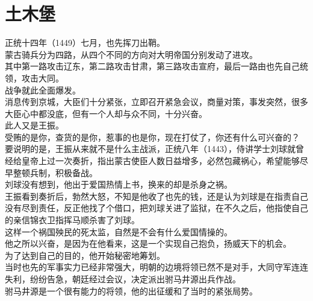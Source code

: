 \section{土木堡}
\ifnum{}
	\begin{multicols}{\theparacolNo}
\fi
正统十四年（1449）七月，也先挥刀出鞘。\\

蒙古骑兵分为四路，从四个不同的方向对大明帝国分别发动了进攻。\\

其中第一路攻击辽东，第二路攻击甘肃，第三路攻击宣府，最后一路由也先自己统领，攻击大同。\\

战争就此全面爆发。\\

消息传到京城，大臣们十分紧张，立即召开紧急会议，商量对策，事发突然，很多大臣心中都没底，但有一个人却与众不同，十分兴奋。\\

此人又是王振。\\

受贿的是你，查货的是你，惹事的也是你，现在打仗了，你还有什么可兴奋的？\\

要说明的是，王振从来就不是什么主战派，正统八年（1443），侍讲学士刘球就曾经给皇帝上过一次奏折，指出蒙古使臣人数日益增多，必然包藏祸心，希望能够尽早整顿兵制，积极备战。\\

刘球没有想到，他出于爱国热情上书，换来的却是杀身之祸。\\

王振看到奏折后，勃然大怒，不知是他收了也先的钱，还是认为刘球是在指责自己没有尽到责任，反正他找了个借口，把刘球关进了监狱，在不久之后，他指使自己的亲信锦衣卫指挥马顺杀害了刘球。\\

这样一个祸国殃民的死太监，自然是不会有什么爱国情操的。\\

他之所以兴奋，是因为在他看来，这是一个实现自己抱负，扬威天下的机会。\\

为了达到自己的目的，他开始秘密地筹划。\\

当时也先的军事实力已经非常强大，明朝的边境将领已然不是对手，大同守军连连失利，纷纷告急，朝廷经过会议，决定派出驸马井源出兵作战。\\

驸马井源是一个很有能力的将领，他的出征缓和了当时的紧张局势。\\


\end{multicols}
